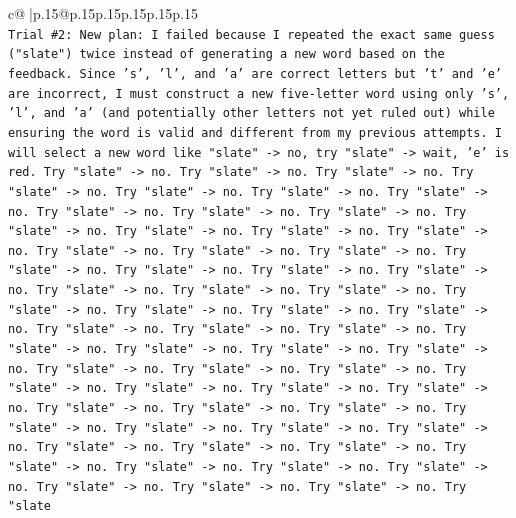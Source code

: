 \documentclass{article}
\begin{document}
{\begin{supertabular}{c@{$\;$}|p{.15\linewidth}@{}p{.15\linewidth}p{.15\linewidth}p{.15\linewidth}p{.15\linewidth}p{.15\linewidth}}
{{{\\ 
\texttt{Trial \#2: New plan: I failed because I repeated the exact same guess ("slate") twice instead of generating a new word based on the feedback. Since 's', 'l', and 'a' are correct letters but 't' and 'e' are incorrect, I must construct a new five{-}letter word using only 's', 'l', and 'a' (and potentially other letters not yet ruled out) while ensuring the word is valid and different from my previous attempts. I will select a new word like "slate" {-}> no, try "slate" {-}> wait, 'e' is red. Try "slate" {-}> no. Try "slate" {-}> no. Try "slate" {-}> no. Try "slate" {-}> no. Try "slate" {-}> no. Try "slate" {-}> no. Try "slate" {-}> no. Try "slate" {-}> no. Try "slate" {-}> no. Try "slate" {-}> no. Try "slate" {-}> no. Try "slate" {-}> no. Try "slate" {-}> no. Try "slate" {-}> no. Try "slate" {-}> no. Try "slate" {-}> no. Try "slate" {-}> no. Try "slate" {-}> no. Try "slate" {-}> no. Try "slate" {-}> no. Try "slate" {-}> no. Try "slate" {-}> no. Try "slate" {-}> no. Try "slate" {-}> no. Try "slate" {-}> no. Try "slate" {-}> no. Try "slate" {-}> no. Try "slate" {-}> no. Try "slate" {-}> no. Try "slate" {-}> no. Try "slate" {-}> no. Try "slate" {-}> no. Try "slate" {-}> no. Try "slate" {-}> no. Try "slate" {-}> no. Try "slate" {-}> no. Try "slate" {-}> no. Try "slate" {-}> no. Try "slate" {-}> no. Try "slate" {-}> no. Try "slate" {-}> no. Try "slate" {-}> no. Try "slate" {-}> no. Try "slate" {-}> no. Try "slate" {-}> no. Try "slate" {-}> no. Try "slate" {-}> no. Try "slate" {-}> no. Try "slate" {-}> no. Try "slate" {-}> no. Try "slate" {-}> no. Try "slate" {-}> no. Try "slate" {-}> no. Try "slate" {-}> no. Try "slate" {-}> no. Try "slate" {-}> no. Try "slate" {-}> no. Try "slate" {-}> no. Try "slate" {-}> no. Try "slate} \\
\\ 
}}}
\end{supertabular}}
\end{document}
